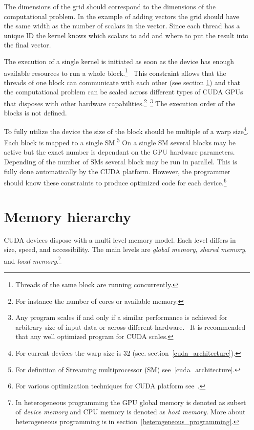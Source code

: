 \documentclass[12pt,oneside]{fithesis2}
\begin{document}
The dimensions of the grid should correspond to the dimensions of the computational problem. In the example of adding vectors the grid should have the same width as the number of scalars in the vector. Since each thread has a unique ID the kernel knows which scalars to add and where to put the result into the final vector.

The execution of a single kernel is initiated as soon as the device has enough available resources to run a whole block.\footnote{Threads of the same block are running concurrently.}~\cite{cuda_guide} This constraint allows that the threads of one block can communicate with each other (see section \ref{memory_hiearchy}) and that the computational problem can be scaled across different types of CUDA GPUs that disposes with other hardware capabilities.\footnote{For instance the number of cores or available memory.}~\footnote{Any program scales if and only if a similar performance is achieved for arbitrary size of input data or across different hardware.~\cite{cuda_best_practices} It is recommended that any well optimized program for CUDA scales.} The execution order of the blocks is not defined.

To fully utilize the device the size of the block should be multiple of a warp size\footnote{For current devices the warp size is 32 (see. section~\ref{cuda_architecture}).}. Each block is mapped to a single SM.\footnote{For definition of Streaming multiprocessor (SM) see~\ref{cuda_architecture}.} On a single SM several blocks may be active but the exact number is dependant on the GPU hardware parameters. Depending of the number of SMs several block may be run in parallel. This is fully done automatically by the CUDA platform. However, the programmer should know these constraints to produce optimized code for each device.\footnote{For various optimization techniques for CUDA platform see~\cite{cuda_best_practices}.}

\section{Memory hierarchy}
\label{memory_hiearchy}

CUDA devices dispose with a multi level memory model. Each level differs in size, speed, and accessibility. The main levels are \emph{global memory}, \emph{shared memory}, and \emph{local memory}.\footnote{In heterogeneous programming the GPU global memory is denoted as subset of \emph{device memory} and CPU memory is denoted as \emph{host memory}. More about heterogeneous programming is in section~\ref{heterogeneous_programming}.}~\cite{cuda_guide}
\end{document}
